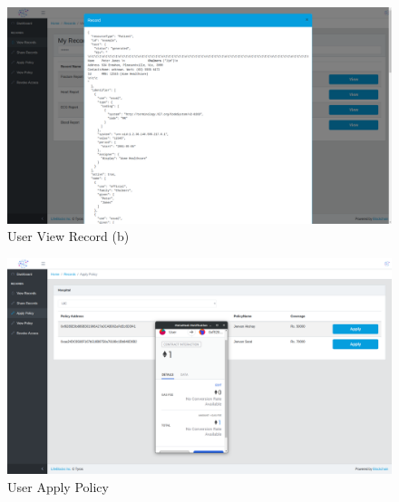 \begin{figure}[!h]
	\centering
	\includegraphics[width=\linewidth]{Images/User/UserViewRecord2.png}
	\caption{ User View Record (b)}
\end{figure}
\begin{figure}[!b]
	\centering
	\includegraphics[width=\linewidth]{Images/User/UserApplyPolicy.png}
	\caption{ User Apply Policy}
\end{figure}

